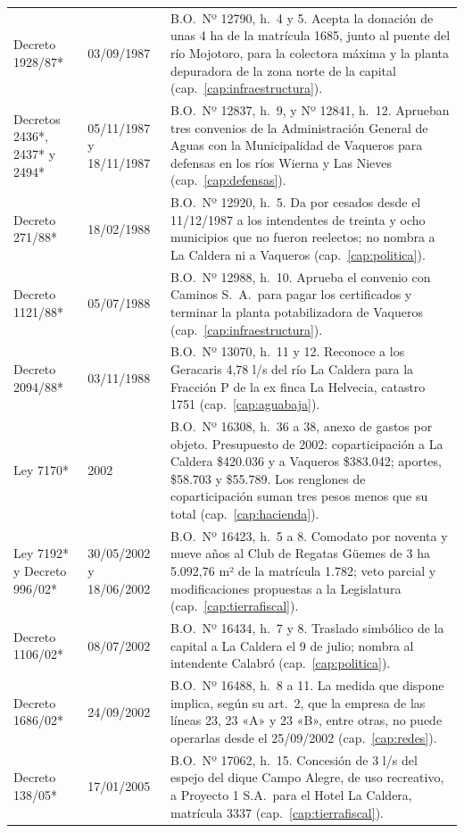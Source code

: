 \begin{longtable}{@{}p{3.2cm}p{1.9cm}p{7.9cm}@{}}
Decreto 1928/87* & 03/09/1987 & B.O.\ Nº 12790, h.\ 4 y 5. Acepta la donación de unas 4 ha de la matrícula 1685, junto al puente del río Mojotoro, para la colectora máxima y la planta depuradora de la zona norte de la capital (cap.\ \ref{cap:infraestructura}). \\
Decretos 2436*, 2437* y 2494* & 05/11/1987 y 18/11/1987 & B.O.\ Nº 12837, h.\ 9, y Nº 12841, h.\ 12. Aprueban tres convenios de la Administración General de Aguas con la Municipalidad de Vaqueros para defensas en los ríos Wierna y Las Nieves (cap.\ \ref{cap:defensas}). \\
Decreto 271/88* & 18/02/1988 & B.O.\ Nº 12920, h.\ 5. Da por cesados desde el 11/12/1987 a los intendentes de treinta y ocho municipios que no fueron reelectos; no nombra a La Caldera ni a Vaqueros (cap.\ \ref{cap:politica}). \\
Decreto 1121/88* & 05/07/1988 & B.O.\ Nº 12988, h.\ 10. Aprueba el convenio con Caminos S.\ A.\ para pagar los certificados y terminar la planta potabilizadora de Vaqueros (cap.\ \ref{cap:infraestructura}). \\
Decreto 2094/88* & 03/11/1988 & B.O.\ Nº 13070, h.\ 11 y 12. Reconoce a los Geracaris 4,78 l/s del río La Caldera para la Fracción P de la ex finca La Helvecia, catastro 1751 (cap.\ \ref{cap:aguabaja}). \\
Ley 7170* & 2002 & B.O.\ Nº 16308, h.\ 36 a 38, anexo de gastos por objeto. Presupuesto de 2002: coparticipación a La Caldera \$420.036 y a Vaqueros \$383.042; aportes, \$58.703 y \$55.789. Los renglones de coparticipación suman tres pesos menos que su total (cap.\ \ref{cap:hacienda}). \\
Ley 7192* y Decreto 996/02* & 30/05/2002 y 18/06/2002 & B.O.\ Nº 16423, h.\ 5 a 8. Comodato por noventa y nueve años al Club de Regatas Güemes de 3 ha 5.092,76 m² de la matrícula 1.782; veto parcial y modificaciones propuestas a la Legislatura (cap.\ \ref{cap:tierrafiscal}). \\
Decreto 1106/02* & 08/07/2002 & B.O.\ Nº 16434, h.\ 7 y 8. Traslado simbólico de la capital a La Caldera el 9 de julio; nombra al intendente Calabró (cap.\ \ref{cap:politica}). \\
Decreto 1686/02* & 24/09/2002 & B.O.\ Nº 16488, h.\ 8 a 11. La medida que dispone implica, según su art.\ 2, que la empresa de las líneas 23, 23 «A» y 23 «B», entre otras, no puede operarlas desde el 25/09/2002 (cap.\ \ref{cap:redes}). \\
Decreto 138/05* & 17/01/2005 & B.O.\ Nº 17062, h.\ 15. Concesión de 3 l/s del espejo del dique Campo Alegre, de uso recreativo, a Proyecto 1 S.A.\ para el Hotel La Caldera, matrícula 3337 (cap.\ \ref{cap:tierrafiscal}). \\

\end{longtable}
